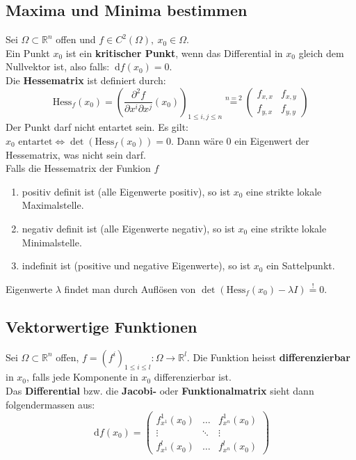 \documentclass[a4paper,10pt]{scrartcl}
\newcommand{\diff}{\ \mathrm{d}}
\begin{document}
\subsection{Maxima und Minima bestimmen}
Sei $\Omega\subset\mathbb{R}^n$ offen und $f\in C^2(\Omega), \ x_0\in \Omega$. \\
Ein Punkt $x_0$ ist ein \textbf{kritischer Punkt}, wenn das Differential in $x_0$ gleich dem Nullvektor ist, also falls: $\diff f (x_0)=0$. \\
Die \textbf{Hessematrix} ist definiert durch:
\begin{equation}
	\text{Hess}_f(x_0)=\left( \frac{\partial^2 f}{\partial x^i\partial x^j}(x_0)\right)_{1\leq i,j\leq n} \overset{n=2}{=} \begin{pmatrix} f_{x,x}&f_{x,y}\\f_{y,x}&f_{y,y} \end{pmatrix}
\end{equation}
Der Punkt darf nicht entartet sein. Es gilt: $x_0 \text{ entartet}\Leftrightarrow \det(\text{Hess}_f(x_0))=0$. Dann wäre $0$ ein Eigenwert der Hessematrix, was nicht sein darf.\\
Falls die Hessematrix der Funkion $f$
\begin{enumerate}[label=$\circ$]
	\setlength{\itemsep}{-3pt}
	\item positiv definit ist (alle Eigenwerte positiv), so ist $x_0$ eine strikte lokale Maximalstelle.
	\item negativ definit ist (alle Eigenwerte negativ), so ist $x_0$ eine strikte lokale Minimalstelle.
	\item indefinit ist (positive und negative Eigenwerte), so ist $x_0$ ein Sattelpunkt. 
\end{enumerate}
Eigenwerte $\lambda$ findet man durch Auflösen von $\det(\text{Hess}_f(x_0)-\lambda I)\overset{!}{=} 0$.
\subsection{Vektorwertige Funktionen}
Sei $\Omega \subset \mathbb{R}^n$ offen, $f=(f^i)_{1\leq i\leq l}:\Omega \to \mathbb{R}^l$. Die Funktion heisst \textbf{differenzierbar} in $x_0$, falls jede Komponente in $x_0$ differenzierbar ist.\\
Das \textbf{Differential} bzw. die \textbf{Jacobi-} oder \textbf{Funktionalmatrix} sieht dann folgendermassen aus: 
\begin{equation}
	\diff f (x_0) = \begin{pmatrix}
		f^1_{x^1}(x_0) & \dots & f^1_{x^n}(x_0)\\
		\vdots& \ddots & \vdots\\
		f^l_{x^1}(x_0) & \dots & f^l_{x^n}(x_0)
	\end{pmatrix}
\end{equation}
\end{document}

